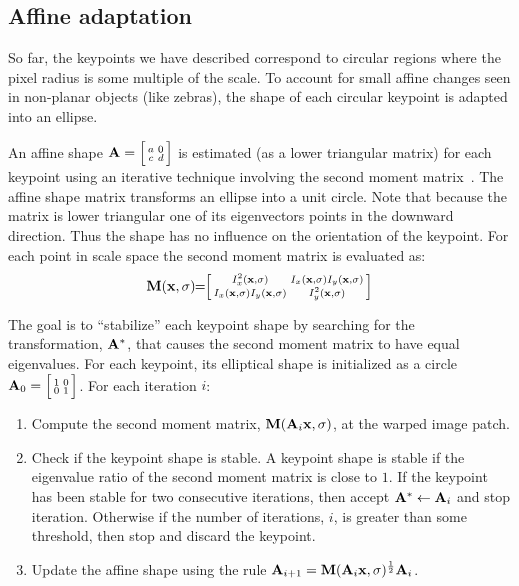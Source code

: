     \subsection{Affine adaptation}
        So far, the keypoints we have described correspond to circular
          regions where the pixel radius is some multiple of the scale.
        To account for small affine changes seen in non-planar objects
          (like zebras), the shape of each circular keypoint is adapted
          into an ellipse.

        An affine shape $\mathbf{A}= \Bigl[ \begin{smallmatrix} a & 0\\c & d \end{smallmatrix} \Bigr] $ is estimated (as a lower triangular
          matrix) for each keypoint using an iterative technique involving the
          second moment
          matrix~\cite{lindeberg_shapeadapted_1997,baumberg_reliable_2000,mikolajczyk_comparison_2005}.
        The affine shape matrix transforms an ellipse into a unit circle.
        Note that because the matrix is lower triangular one of its
          eigenvectors points in the downward direction.
        Thus the shape has no influence on the orientation of the keypoint.
        For each point in scale space the second moment matrix is evaluated
          as:
        \begin{equation}\label{eqn:secondmoment}
                \mathbf{M}(\mathbf{x}, \sigma) 
                \mkern-6mu=\mkern-6mu 
                 \Bigl[ \begin{smallmatrix}  
                I_x^2(\mathbf{x}, \sigma)      & I_x(\mathbf{x}, \sigma) I_y(\mathbf{x}, \sigma) \\
                I_x(\mathbf{x}, \sigma) I_y(\mathbf{x}, \sigma) & I_y^2(\mathbf{x}, \sigma)  \end{smallmatrix} \Bigr] 
        \end{equation}

        The goal is to ``stabilize'' each keypoint shape by searching for the
          transformation, $\mathbf{A}^*$, that causes the second moment matrix to
          have equal eigenvalues.
        For each keypoint, its elliptical shape is initialized as a circle
          $\mathbf{A}_0= \Bigl[ \begin{smallmatrix} 1 & 0\\0 & 1 \end{smallmatrix} \Bigr] $.
        For each iteration $i$:

        \begin{enumerate}

            \item Compute the second moment matrix,
              $\mathbf{M}(\mathbf{A}_i\mathbf{x}, \sigma)$, at the warped image patch.

            \item Check if the keypoint shape is stable.
            A keypoint shape is stable if the eigenvalue ratio of the second
              moment matrix is close to $1$.
            If the keypoint has been stable for two consecutive iterations, then
              accept $\mathbf{A}^* \leftarrow \mathbf{A}_{i}$ and stop iteration.
            Otherwise if the number of iterations, $i$, is greater than some
              threshold, then stop and discard the keypoint.

            \item Update the affine shape  using the rule
                $\mathbf{A}_{i + 1} = \mathbf{M}(\mathbf{A}_i\mathbf{x}, \sigma)^{\frac{1}{2}} \mathbf{A}_i$.
        \end{enumerate}

